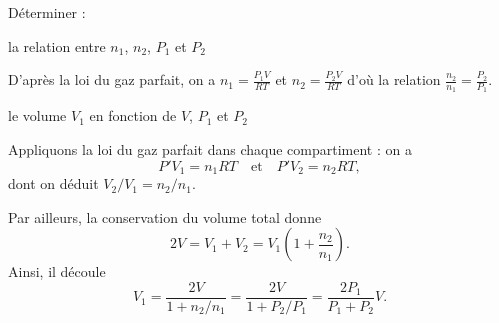 Déterminer :


\debutEntrainement

\begin{enonce}
la relation entre $n_1$, $n_2$, $P_1$ et $P_2$
\end{enonce}


\begin{corrige}
D'après la loi du gaz parfait, on a $n_1=\frac{P_1V}{RT}$ et $n_2=\frac{P_2V}{RT}$ d'où la relation $\frac{n_2}{n_1}=\frac{P_2}{P_1}$.
\end{corrige}


\begin{enonce}
le volume $V_1$ en fonction de $V$, $P_1$ et $P_2$
\end{enonce}


\begin{corrige}
Appliquons la loi du gaz parfait dans chaque compartiment : on a 
\[
P'V_1=n_1RT\quad\text{et}\quad P'V_2=n_2RT,
\] 
dont on déduit $V_2/V_1=n_2/n_1$. 

Par ailleurs, la conservation du volume total donne
\[
2V=V_1+V_2=V_1\left(1+\frac{n_2}{n_1}\right).
\]
Ainsi, il découle
\[
	V_1=\frac{2V}{1+n_2/n_1}=
	\frac{2V}{1+P_2/P_1}=
	\frac{2P_1}{P_1+P_2}V.
\]
\end{corrige}


\finEntrainement



\newpage





